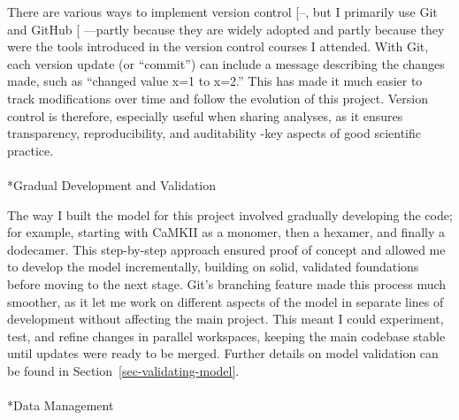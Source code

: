 \documentclass[
  11pt,
  letterpaper,
]{scrreprt}
\makeatletter
\let\oldparagraph\paragraph
\renewcommand{\paragraph}{
    \@ifstar
      \xxxParagraphStar
      \xxxParagraphNoStar
  }
\newcommand{\xxxParagraphStar}[1]{\oldparagraph*{#1}\mbox{}}
\newcommand{\xxxParagraphNoStar}[1]{\oldparagraph{#1}\mbox{}}
\makeatother
\begin{document}
There are various ways to implement version control
{[}--\citeproc{ref-hethey2013GitLab}{395}{]},
but I primarily use Git and GitHub
{[}\citeproc{ref-loeliger2012Version}{396}{]} ---partly because they are
widely adopted and partly because they were the tools introduced in the
version control courses I attended. With Git, each version update (or
``commit'') can include a message describing the changes made, such as
``changed value x=1 to x=2.'' This has made it much easier to track
modifications over time and follow the evolution of this project.
Version control is therefore, especially useful when sharing analyses,
as it ensures transparency, reproducibility, and auditability -key
aspects of good scientific practice.

\paragraph*{Gradual Development and
Validation}\label{gradual-development-and-validation}

The way I built the model for this project involved gradually developing
the code; for example, starting with CaMKII as a monomer, then a
hexamer, and finally a dodecamer. This step-by-step approach ensured
proof of concept and allowed me to develop the model incrementally,
building on solid, validated foundations before moving to the next
stage. Git's branching feature made this process much smoother, as it
let me work on different aspects of the model in separate lines of
development without affecting the main project. This meant I could
experiment, test, and refine changes in parallel workspaces, keeping the
main codebase stable until updates were ready to be merged. Further
details on model validation can be found in
Section~\ref{sec-validating-model}.

\paragraph*{Data Management}\label{data-management}
\end{document}
